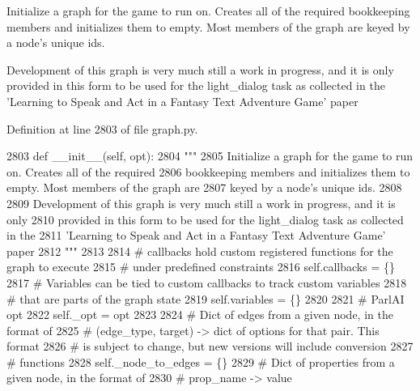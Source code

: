 \begin{DoxyVerb}Initialize a graph for the game to run on. Creates all of the required
bookkeeping members and initializes them to empty. Most members of the graph are
keyed by a node's unique ids.

Development of this graph is very much still a work in progress, and it is only
provided in this form to be used for the light_dialog task as collected in the
'Learning to Speak and Act in a Fantasy Text Adventure Game' paper
\end{DoxyVerb}
 

Definition at line 2803 of file graph.\+py.


\begin{DoxyCode}
2803     \textcolor{keyword}{def }\_\_init\_\_(self, opt):
2804         \textcolor{stringliteral}{"""}
2805 \textcolor{stringliteral}{        Initialize a graph for the game to run on. Creates all of the required}
2806 \textcolor{stringliteral}{        bookkeeping members and initializes them to empty. Most members of the graph are}
2807 \textcolor{stringliteral}{        keyed by a node's unique ids.}
2808 \textcolor{stringliteral}{}
2809 \textcolor{stringliteral}{        Development of this graph is very much still a work in progress, and it is only}
2810 \textcolor{stringliteral}{        provided in this form to be used for the light\_dialog task as collected in the}
2811 \textcolor{stringliteral}{        'Learning to Speak and Act in a Fantasy Text Adventure Game' paper}
2812 \textcolor{stringliteral}{        """}
2813 
2814         \textcolor{comment}{# callbacks hold custom registered functions for the graph to execute}
2815         \textcolor{comment}{# under predefined constraints}
2816         self.callbacks = \{\}
2817         \textcolor{comment}{# Variables can be tied to custom callbacks to track custom variables}
2818         \textcolor{comment}{# that are parts of the graph state}
2819         self.variables = \{\}
2820 
2821         \textcolor{comment}{# ParlAI opt}
2822         self.\_opt = opt
2823 
2824         \textcolor{comment}{# Dict of edges from a given node, in the format of}
2825         \textcolor{comment}{# (edge\_type, target) -> dict of options for that pair. This format}
2826         \textcolor{comment}{# is subject to change, but new versions will include conversion}
2827         \textcolor{comment}{# functions}
2828         self.\_node\_to\_edges = \{\}
2829         \textcolor{comment}{# Dict of properties from a given node, in the format of}
2830         \textcolor{comment}{# prop\_name -> value}

\end{DoxyCode}
